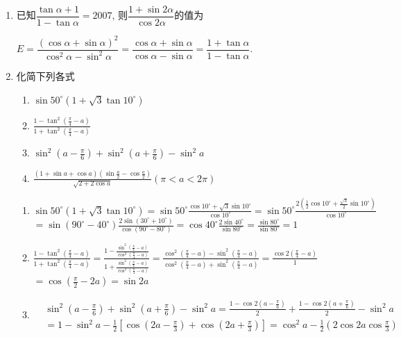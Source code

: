 \begin{enumerate}
\item 已知$\dfrac{\tan\alpha+1}{1-\tan\alpha}=2007$, 则$\dfrac{1+\sin2\alpha}{\cos2\alpha}$的值为
\begin{jieda}
$E=\dfrac{(\cos\alpha+\sin\alpha)^2}{\cos^2\alpha-\sin^2\alpha}=\dfrac{\cos\alpha+\sin\alpha}{\cos\alpha-\sin\alpha}=\dfrac{1+\tan\alpha}{1-\tan\alpha}$. 
\end{jieda}

\item 化简下列各式
\begin{enumerate}
    \item $\sin 50^{\circ}\left(1+\sqrt{3} \tan 10^{\circ}\right)$
    \item $\frac{1-\tan ^2\left(\frac{\pi}{4}-a\right)}{1+\tan ^2\left(\frac{\pi}{4}-a\right)}$
    \item $\sin ^2\left(a-\frac{\pi}{6}\right)+\sin ^2\left(a+\frac{\pi}{6}\right)-\sin ^2 a$
    \item $
    \frac{(1+\sin a+\cos a)\left(\sin \frac{a}{2}-\cos \frac{a}{2}\right)}{\sqrt{2+2 \cos a}}(\pi<a<2 \pi) $
\end{enumerate}
\begin{jieda}
\begin{enumerate}
    \item $\sin 50^{\circ}\left(1+\sqrt{3} \tan 10^{\circ}\right)=\sin 50^{\circ} \frac{\cos 10^{\circ}+\sqrt{3} \sin 10^{\circ}}{\cos 10^{\circ}}=\sin 50^{\circ} \frac{2\left(\frac{1}{2} \cos 10^{\circ}+\frac{\sqrt{3}}{2} \sin 10^{\circ}\right)}{\cos 10^{\circ}}$
$
=\sin \left(90^{\circ}-40^{\circ}\right) \frac{2 \sin \left(30^{\circ}+10^{\circ}\right)}{\cos \left(90^{\circ}-80^{\circ}\right)}=\cos 40^{\circ} \frac{2 \sin 40^{\circ}}{\sin 80^{\circ}}=\frac{\sin 80^{\circ}}{\sin 80^{\circ}}=1
$
\item $\frac{1-\tan ^2\left(\frac{\pi}{4}-a\right)}{1+\tan ^2\left(\frac{\pi}{4}-a\right)}=\frac{1-\frac{\sin ^2\left(\frac{\pi}{4}-a\right)}{\cos ^2\left(\frac{\pi}{4}-a\right)}}{1+\frac{\sin ^2\left(\frac{\pi}{4}-a\right)}{\cos ^2\left(\frac{\pi}{4}-a\right)}}=\frac{\cos ^2\left(\frac{\pi}{4}-a\right)-\sin ^2\left(\frac{\pi}{4}-a\right)}{\cos ^2\left(\frac{\pi}{4}-a\right)+\sin ^2\left(\frac{\pi}{4}-a\right)}=\frac{\cos 2\left(\frac{\pi}{4}-a\right)}{1}$
$=\cos \left(\frac{\pi}{2}-2 a\right)=\sin 2 a$


\item $
\begin{aligned}
&  \sin ^2\left(a-\frac{\pi}{6}\right)+\sin ^2\left(a+\frac{\pi}{6}\right)-\sin ^2 a=\frac{1-\cos 2\left(a-\frac{\pi}{6}\right)}{2}+\frac{1-\cos 2\left(a+\frac{\pi}{6}\right)}{2}-\sin ^2 a \\
& =1-\sin ^2 a-\frac{1}{2}\left[\cos \left(2 a-\frac{\pi}{3}\right)+\cos \left(2 a+\frac{\pi}{3}\right)\right]=\cos ^2 a-\frac{1}{2}\left(2 \cos 2 a \cos \frac{\pi}{3}\right)
\end{aligned}$


\end{enumerate}
\end{jieda}
\end{enumerate}
